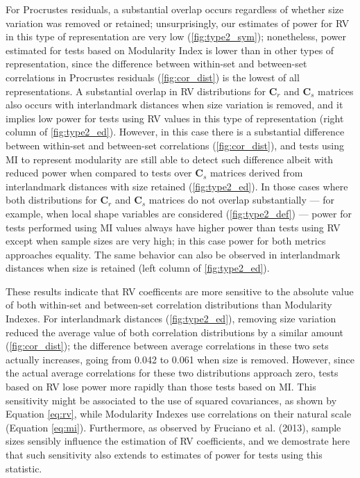 \documentclass[12pt,twoside]{report}
\begin{document}
For Procrustes residuals, a substantial overlap occurs regardless of
whether size variation was removed or retained; unsurprisingly, our
estimates of power for RV in this type of representation are very low
(\autoref{fig:type2_sym}); nonetheless, power estimated for tests based
on Modularity Index is lower than in other types of representation,
since the difference between within-set and between-set correlations in
Procrustes residuals (\autoref{fig:cor_dist}) is the lowest of all
representations. A substantial overlap in RV distributions for
$\mathbf{C}_r$ and $\mathbf{C}_s$ matrices also occurs with
interlandmark distances when size variation is removed, and it implies
low power for tests using RV values in this type of representation
(right column of \autoref{fig:type2_ed}). However, in this case there is
a substantial difference between within-set and between-set correlations
(\autoref{fig:cor_dist}), and tests using MI to represent modularity are
still able to detect such difference albeit with reduced power when
compared to tests over $\mathbf{C}_s$ matrices derived from
interlandmark distances with size retained (\autoref{fig:type2_ed}). In
those cases where both distributions for $\mathbf{C}_r$ and
$\mathbf{C}_s$ matrices do not overlap substantially --- for example,
when local shape variables are considered (\autoref{fig:type2_def}) ---
power for tests performed using MI values always have higher power than
tests using RV except when sample sizes are very high; in this case
power for both metrics approaches equality. The same behavior can also
be observed in interlandmark distances when size is retained (left
column of \autoref{fig:type2_ed}).

These results indicate that RV coefficents are more sensitive to the
absolute value of both within-set and between-set correlation
distributions than Modularity Indexes. For interlandmark distances
(\autoref{fig:type2_ed}), removing size variation reduced the average
value of both correlation distributions by a similar amount
(\autoref{fig:cor_dist}); the difference between average correlations in
these two sets actually increases, going from 0.042 to 0.061 when size
is removed. However, since the actual average correlations for these two
distributions approach zero, tests based on RV lose power more rapidly
than those tests based on MI. This sensitivity might be associated to
the use of squared covariances, as shown by Equation \ref{eq:rv}, while
Modularity Indexes use correlations on their natural scale (Equation
\ref{eq:mi}). Furthermore, as observed by Fruciano et al. (2013), sample
sizes sensibly influence the estimation of RV coefficients, and we
demostrate here that such sensitivity also extends to estimates of power
for tests using this statistic.
\end{document}
